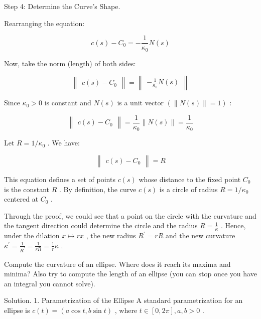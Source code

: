 \documentclass[10pt]{article}
\begin{document}
Step 4: Determine the Curve's Shape.

Rearranging the equation:

\[
c\left( s\right)  - {C}_{0} =  - \frac{1}{{\kappa }_{0}}N\left( s\right)
\]

Now, take the norm (length) of both sides:

\[
\begin{Vmatrix}{c\left( s\right)  - {C}_{0}}\end{Vmatrix} = \begin{Vmatrix}{-\frac{1}{{\kappa }_{0}}N\left( s\right) }\end{Vmatrix}
\]

Since \({\kappa }_{0} > 0\) is constant and \(N\left( s\right)\) is a unit vector \(\left( {\parallel N\left( s\right) \parallel  = 1}\right)\) :

\[
\begin{Vmatrix}{c\left( s\right)  - {C}_{0}}\end{Vmatrix} = \frac{1}{{\kappa }_{0}}\parallel N\left( s\right) \parallel  = \frac{1}{{\kappa }_{0}}
\]

Let \(R = 1/{\kappa }_{0}\) . We have:

\[
\begin{Vmatrix}{c\left( s\right)  - {C}_{0}}\end{Vmatrix} = R
\]

This equation defines a set of points \(c\left( s\right)\) whose distance to the fixed point \({C}_{0}\) is the constant \(R\) . By definition, the curve \(c\left( s\right)\) is a circle of radius \(R = 1/{\kappa }_{0}\) centered at \({C}_{0}\) .

Through the proof, we could see that a point on the circle with the curvature and the tangent direction could determine the circle and the radius \(R = \frac{1}{\kappa }\) . Hence, under the dilation \(x \mapsto  {rx}\) , the new radius \({R}^{\prime } = {rR}\) and the new curvature \({\kappa }^{\prime } = \frac{1}{{R}^{\prime }} = \frac{1}{rR} = \frac{1}{r}\kappa\) .

\begin{problem}[title=PROBLEM 2 (5 POINTS)]
Compute the curvature of an ellipse. Where does it reach its maxima and minima? Also try to compute the length of an ellipse (you can stop once you have an integral you cannot solve).
\end{problem}

Solution. 1. Parametrization of the Ellipse A standard parametrization for an ellipse is \(c\left( t\right)  = \left( {a\cos t,b\sin t}\right)\) , where \(t \in  \left\lbrack  {0,{2\pi }}\right\rbrack  ,a,b > 0\) .
\end{document}
